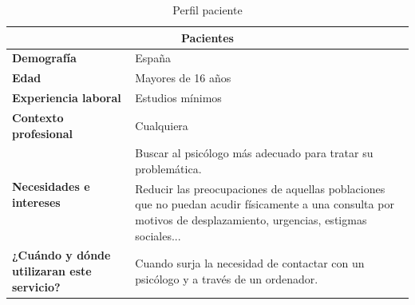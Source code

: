 \begin{table}[htpb]
\centering
\begin{tabularx}{\textwidth}{|X|X|}
\hline
\multicolumn{2}{|c|}{\textbf{Pacientes}}                                                                                                                                                                               \\ \hline
\textbf{Demografía}                                & España                                                                                                                                                            \\ \hline
\textbf{Edad}                                      & Mayores de 16 años                                                                                                                                                \\ \hline
\textbf{Experiencia laboral}                       & Estudios mínimos                                                                                                                                                  \\ \hline
\textbf{Contexto profesional}                      & Cualquiera                                                                                                                                                        \\ \hline
\multirow{2}{*}{\textbf{Necesidades e intereses}}  & Buscar al psicólogo más adecuado para tratar su problemática.                                                                                                     \\ \cline{2-2} 
                                                   & Reducir las preocupaciones de aquellas poblaciones que no puedan acudir físicamente a una consulta por motivos de desplazamiento, urgencias, estigmas sociales... \\ \hline
\textbf{¿Cuándo y dónde utilizaran este servicio?} & Cuando surja la necesidad de contactar con un psicólogo y a través de un ordenador.                                                                               \\ \hline
\end{tabularx}
\caption{Perfil paciente}
\label{perf_pac}
\end{table}


